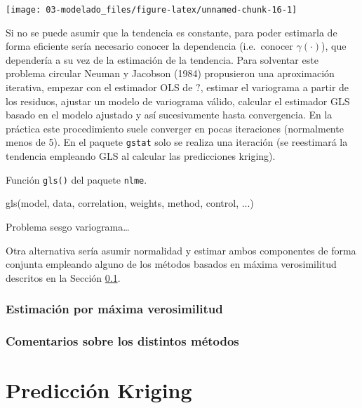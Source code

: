 \documentclass[
  spanish,
]{book}
\newenvironment{Shaded}{\begin{snugshade}}{\end{snugshade}}
\newcommand{\FunctionTok}[1]{\textcolor[rgb]{0.00,0.00,0.00}{#1}}
\newcommand{\NormalTok}[1]{#1}
\theoremstyle{break}
\theoremstyle{definition}
\theoremstyle{definition}
\theoremstyle{definition}
\theoremstyle{definition}
\theoremstyle{remark}
\begin{document}
\begin{center}\texttt{[image: 03-modelado\_files/figure-latex/unnamed-chunk-16-1]} \end{center}

Si no se puede asumir que la tendencia es constante, para poder estimarla de forma eficiente sería necesario conocer la dependencia (i.e.~conocer \(\gamma(\cdot)\)), que dependería a su vez de la estimación de la tendencia.
Para solventar este problema circular Neuman y Jacobson (1984) propusieron una aproximación iterativa, empezar con el estimador OLS de \(?\), estimar el variograma a partir de los residuos, ajustar un modelo de variograma válido, calcular el estimador GLS basado en el modelo ajustado y así sucesivamente hasta convergencia.
En la práctica este procedimiento suele converger en pocas iteraciones (normalmente menos de 5).
En el paquete \texttt{gstat} solo se realiza una iteración (se reestimará la tendencia empleando GLS al calcular las predicciones kriging).

Función \texttt{gls()} del paquete \texttt{nlme}.

\begin{Shaded}
\begin{Highlighting}[]
\FunctionTok{gls}\NormalTok{(model, data, correlation, weights, method, control, ...)}
\end{Highlighting}
\end{Shaded}

Problema sesgo variograma\ldots{}

Otra alternativa sería asumir normalidad y estimar ambos componentes de forma conjunta empleando alguno de los métodos basados en máxima verosimilitud descritos en la Sección \ref{ml-fit}.

\hypertarget{ml-fit}{%
\subsection{Estimación por máxima verosimilitud}\label{ml-fit}}

\hypertarget{comentarios-sobre-los-distintos-muxe9todos}{%
\subsection{Comentarios sobre los distintos métodos}\label{comentarios-sobre-los-distintos-muxe9todos}}

\hypertarget{kriging}{%
\chapter{Predicción Kriging}\label{kriging}}
\end{document}
